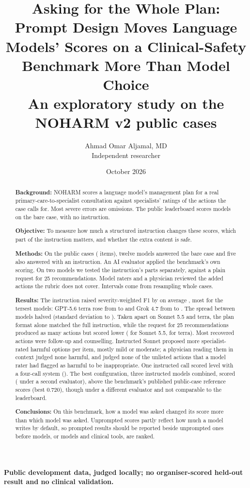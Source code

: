 \documentclass[11pt]{article}
\title{Asking for the Whole Plan:\\Prompt Design Moves Language Models' Scores on a
Clinical-Safety Benchmark More Than Model Choice\\[4pt]
\large An exploratory study on the NOHARM v2 public cases}
\author{Ahmad Omar Aljamal, MD\\[2pt]\small Independent researcher}
\date{October 2026}
\begin{document}
\maketitle
\begin{center}
\small\textbf{Public development data, judged locally; no organiser-scored held-out result and
no clinical validation.}
\end{center}

\begin{abstract}
\textbf{Background:} NOHARM scores a language model's management plan for a real
primary-care-to-specialist consultation against specialists' ratings of the actions the case calls
for. Most severe errors are omissions. The public leaderboard scores models on the bare case, with
no instruction.
\par\smallskip\noindent
\textbf{Objective:} To measure how much a structured instruction changes these scores, which part of
the instruction matters, and whether the extra content is safe.
\par\smallskip\noindent
\textbf{Methods:} On the \nCases{} public cases (\nItems{} items), twelve models answered the bare
case and five also answered with an instruction. An AI evaluator applied the benchmark's own
scoring. On two models we tested the instruction's parts separately, against a plain request for 25
recommendations. Model raters and a physician reviewed the added actions the rubric does not cover.
Intervals come from resampling whole cases.
\par\smallskip\noindent
\textbf{Results:} The instruction raised severity-weighted F1 by \covPaperGridMeanGain{} on average
\covPaperGridMeanGainCI{}, most for the tersest models: GPT-5.6 terra rose from \covFTerraBare{} to
\covFTerraSpec{} and Grok 4.7 from \covFGrokBare{} to \covFGrokThorough{}. The spread between models
halved (standard deviation \covPaperGridSdBare{} to \covPaperGridSdSpec{}). Taken apart on Sonnet 5.5
and terra, the plan format alone matched the full instruction, while the request for 25
recommendations produced as many actions but scored lower (\covDSonnetLengthVsSpec{} for Sonnet 5.5, \covDTerraLengthVsSpec{} for terra). Most
recovered actions were follow-up and counselling. Instructed Sonnet proposed \covHarmSonnetDiff{}
more specialist-rated harmful options per item, mostly mild or moderate; a physician reading them in
context judged none harmful, and judged none of the \covPhysFlagged{} unlisted actions that a model
rater had flagged as harmful to be inappropriate. One instructed call scored level with a four-call system
(\covDTerraSpecVsGap{}). The best configuration, three instructed models combined, scored
\covFUnionPrompt{} (\covFUnionPromptJT{} under a second evaluator), above the benchmark's published
public-case reference scores (best 0.720), though under a different evaluator and not comparable to
the leaderboard.
\par\smallskip\noindent
\textbf{Conclusions:} On this benchmark, how a model was asked changed its score more than which model
was asked. Unprompted scores partly reflect how much a model writes by default, so prompted results
should be reported beside unprompted ones before models, or models and clinical tools, are ranked.
\end{abstract}
\end{document}
